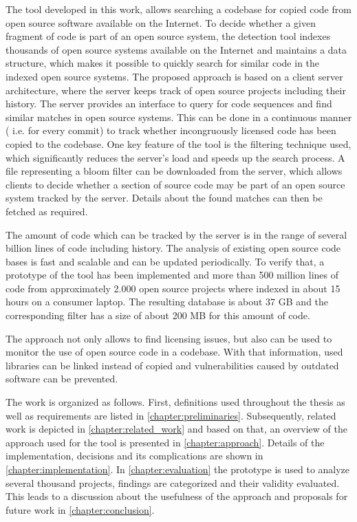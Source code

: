 The tool developed in this work, allows searching a codebase for copied code from open source software available on the Internet.
To decide whether a given fragment of code is part of an open source system, the detection tool indexes thousands of open source systems available on the Internet and maintains a data structure, which makes it possible to quickly search for similar code in the indexed open source systems.
The proposed approach is based on a client server architecture, where the server keeps track of open source projects including their history.
The server provides an interface to query for code sequences and find similar matches in open source systems.
This can be done in a continuous manner ( i.e. for every commit) to track whether incongruously licensed code has been copied to the codebase.
One key feature of the tool is the filtering technique used, which significantly reduces the server's load and speeds up the search process.
A file representing a bloom filter can be downloaded from the server, which allows clients to decide whether a section of source code may be part of an open source system tracked by the server.
Details about the found matches can then be fetched as required.

The amount of code which can be tracked by the server is in the range of several billion lines of code including history.
The analysis of existing open source code bases is fast and scalable and can be updated periodically.
To verify that, a prototype of the tool has been implemented and more than 500 million lines of code from approximately 2.000 open source projects where indexed in about 15 hours on a consumer laptop.
The resulting database is about 37 GB and the corresponding filter has a size of about 200 MB for this amount of code.

The approach not only allows to find licensing issues, but also can be used to monitor the use of open source code in a codebase.
With that information, used libraries can be linked instead of copied and vulnerabilities caused by outdated software can be prevented.

The work is organized as follows.
First, definitions used throughout the thesis as well as requirements are listed in \autoref{chapter:preliminaries}.
Subsequently, related work is depicted in \autoref{chapter:related_work} and based on that, an overview of the approach used for the tool is presented in \autoref{chapter:approach}.
Details of the implementation, decisions and its complications are shown in \autoref{chapter:implementation}.
In \autoref{chapter:evaluation} the prototype is used to analyze several thousand projects, findings are categorized and their validity evaluated.
This leads to a discussion about the usefulness of the approach and proposals for future work in \autoref{chapter:conclusion}.
